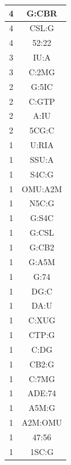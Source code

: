 \begin{center}
\begin{longtable}{c|c}
      4 & G:CBR    \\ \hline
      4 & CSL:G    \\ \hline
      4 & 52:22    \\ \hline
      3 & IU:A     \\ \hline
      3 & C:2MG    \\ \hline
      2 & G:5IC    \\ \hline
      2 & C:GTP    \\ \hline
      2 & A:IU     \\ \hline
      2 & 5CG:C    \\ \hline
      1 & U:RIA    \\ \hline
      1 & SSU:A    \\ \hline
      1 & S4C:G    \\ \hline
      1 & OMU:A2M  \\ \hline
      1 & N5C:G    \\ \hline
      1 & G:S4C    \\ \hline
      1 & G:CSL    \\ \hline
      1 & G:CB2    \\ \hline
      1 & G:A5M    \\ \hline
      1 & G:74     \\ \hline
      1 & DG:C     \\ \hline
      1 & DA:U     \\ \hline
      1 & C:XUG    \\ \hline
      1 & CTP:G    \\ \hline
      1 & C:DG     \\ \hline
      1 & CB2:G    \\ \hline
      1 & C:7MG    \\ \hline
      1 & ADE:74   \\ \hline
      1 & A5M:G    \\ \hline
      1 & A2M:OMU  \\ \hline
      1 & 47:56    \\ \hline
      1 & 1SC:G    \\ \hline 
\end{longtable}
\end{center}

